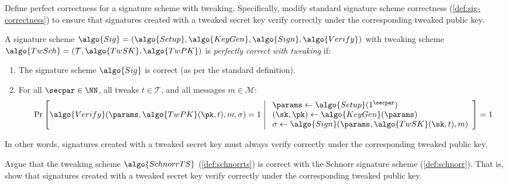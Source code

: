\begin{exercise}
  Define perfect correctness for a signature scheme with tweaking.
  Specifically, modify standard signature scheme correctness (\autoref{def:sig-correctness}) to ensure that signatures created with a tweaked secret key verify correctly under the corresponding tweaked public key.
\end{exercise}

\ifsolutions
\begin{mysolution}
  A signature scheme $\algo{Sig} = (\algo{Setup}, \algo{KeyGen}, \algo{Sign}, \algo{Verify})$ with tweaking scheme $\algo{TwSch} = (\mathcal{T}, \algo{TwSK}, \algo{TwPK})$ is \emph{perfectly correct with tweaking} if:
  \begin{enumerate}
    \item The signature scheme $\algo{Sig}$ is correct (as per the standard definition).
    \item For all $\secpar \in \NN$, all tweaks $t \in \mathcal{T}$, and all messages $m \in \mathcal{M}$:
    \[
      \Pr\left[\algo{Verify}(\params, \algo{TwPK}(\pk, t), m, \sigma) = 1 \;\middle|\; \begin{array}{l}
        \params \gets \algo{Setup}(1^\secpar) \\
        (\sk, \pk) \gets \algo{KeyGen}(\params) \\
        \sigma \gets \algo{Sign}(\params, \algo{TwSK}(\sk, t), m)
      \end{array}\right] = 1
    \]
  \end{enumerate}
  
  In other words, signatures created with a tweaked secret key must always verify correctly under the corresponding tweaked public key.
\end{mysolution}
\fi

\begin{exercise}[Optional]
  Argue that the tweaking scheme $\algo{SchnorrTS}$ (\autoref{def:schnorrts}) is correct with the Schnorr signature scheme (\autoref{def:schnorr}).
  That is, show that signatures created with a tweaked secret key verify correctly under the corresponding tweaked public key.
\end{exercise}

